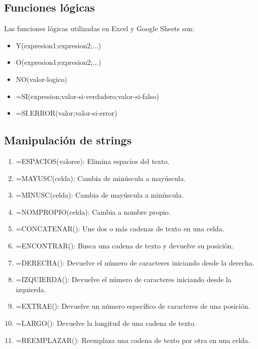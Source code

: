 \documentclass[a4paper, 12pt]{book}
\begin{document}
\subsection{Funciones lógicas}
Las funciones lógicas utilizadas en Excel y Google Sheets son:
\begin{itemize}
\item Y(expresion1;expresion2;...)
\item O(expresion1;expresion2;...)
\item NO(valor-logico)
\item =SI(expresion;valor-si-verdadero;valor-si-falso)
\item =SI.ERROR(valor;valor-si-error)
\end{itemize}
\subsection{Manipulación de strings}
\begin{enumerate}
\item =ESPACIOS(valores): Elimina espacios del texto.
\item =MAYUSC(celda): Cambia de minúscula a mayúscula.
\item =MINUSC(celda): Cambia de mayúscula a minúscula.
\item =NOMPROPIO(celda): Cambia a nombre propio.
\item =CONCATENAR(): Une dos o más cadenas de texto en una celda.
\item =ENCONTRAR(): Busca una cadena de texto y devuelve su posición.
\item =DERECHA(): Devuelve el número de caracteres iniciando desde la derecha.
\item =IZQUIERDA(): Devuelve el número de caracteres iniciando desde la izquierda.
\item =EXTRAE(): Devuelve un número específico de caracteres de una posición.
\item =LARGO(): Devuelve la longitud de una cadena de texto.
\item =REEMPLAZAR(): Reemplaza una cadena de texto por otra en una celda.
\end{enumerate}
\end{document}
